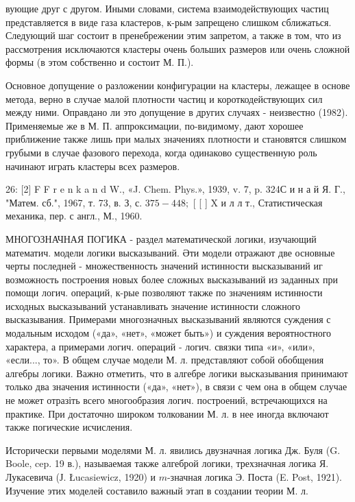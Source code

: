 \documentclass[10pt]{article}
\begin{document}
вующие друг с другом. Иными словами, система взаимодействующих частиц представляется в виде газа кластеров, к-рым запрещено слишком сближаться. Следующий шаг состоит в пренебрежении этим запретом, а также в том, что из рассмотрения исключаются кластеры очень больших размеров или очень сложной формы (в этом собственно и состоит М. П.).



Основное допущение о разложении конфигурации на кластеры, лежащее в основе метода, верно в случае малой плотности частиц и короткодействующих сил между ними. Оправдано ли это допущение в других случаях - неизвестно (1982). Применяемые же в М. П. аппроксимации, по-видимому, дают хорошее приближение также лишь при малых значениях плотности и становятся слишком грубыми в случае фазового перехода, когда одинаково существенную роль начинают играть кластеры всех размеров.



26: [2] F F r e n k a n d W., «J. Chem. Phys.», 1939, v. 7, p. 324С и н а й Я. Г., "Матем. сб.", 1967, т. 73, в. З, с. $375-448 ;$ [ [ ] X и л л т., Статистическая механика, пер. с англ., М., 1960.



МНОГОЗНАЧНАЯ ПОГИКА - раздел математической логики, изучающий математич. модели логики высказываний. Әти модели отражают две основные черты последней - множественность значений истинности высказываний иг возможность построения новых более сложных высказываний из заданных при помощи логич. операций, к-рые позволяют также по значениям истинности исходных высказываний устанавливать значение истинности сложного высказывания. Примерами многозначных высказываний являются суждения с модальным исходом («да», «нет», «может быть») и суждения вероятностного характера, а примерами логич. операций - логич. связки типа «и», «или», «если..., то». В общем случае модели М. л. представляют собой обобщения алгебры логики. Важно отметить, что в алгебре логики высказывания принимают только два значения истинности («да», «нет»), в связи с чем она в общем случае не может отразіть всего многообразия логич. построений, встречающихся на практике. При достаточно широком толковании М. л. в нее иногда включают также погические исчисления.



Исторически первыми моделями М. л. явились двузначная логика Дж. Буля (G. Boole, cep. 19 в.), называемая также алгеброй логики, трехзначная логика Я. Лукасевича (Ј. Łucasiewicz, 1920) и $m$-значная логика Э. Поста (E. Post, 1921). Изучение этих моделей составило важный этап в создании теории М. л.
\end{document}
